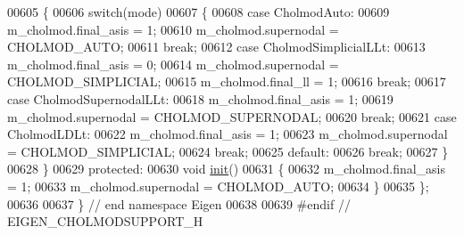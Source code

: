 \begin{DoxyCode}
00605     \{
00606       \textcolor{keywordflow}{switch}(mode)
00607       \{
00608         \textcolor{keywordflow}{case} CholmodAuto:
00609           m\_cholmod.final\_asis = 1;
00610           m\_cholmod.supernodal = CHOLMOD\_AUTO;
00611           \textcolor{keywordflow}{break};
00612         \textcolor{keywordflow}{case} CholmodSimplicialLLt:
00613           m\_cholmod.final\_asis = 0;
00614           m\_cholmod.supernodal = CHOLMOD\_SIMPLICIAL;
00615           m\_cholmod.final\_ll = 1;
00616           \textcolor{keywordflow}{break};
00617         \textcolor{keywordflow}{case} CholmodSupernodalLLt:
00618           m\_cholmod.final\_asis = 1;
00619           m\_cholmod.supernodal = CHOLMOD\_SUPERNODAL;
00620           \textcolor{keywordflow}{break};
00621         \textcolor{keywordflow}{case} CholmodLDLt:
00622           m\_cholmod.final\_asis = 1;
00623           m\_cholmod.supernodal = CHOLMOD\_SIMPLICIAL;
00624           \textcolor{keywordflow}{break};
00625         \textcolor{keywordflow}{default}:
00626           \textcolor{keywordflow}{break};
00627       \}
00628     \}
00629   \textcolor{keyword}{protected}:
00630     \textcolor{keywordtype}{void} \hyperlink{structinit}{init}()
00631     \{
00632       m\_cholmod.final\_asis = 1;
00633       m\_cholmod.supernodal = CHOLMOD\_AUTO;
00634     \}
00635 \};
00636 
00637 \} \textcolor{comment}{// end namespace Eigen}
00638 
00639 \textcolor{preprocessor}{#endif // EIGEN\_CHOLMODSUPPORT\_H}
\end{DoxyCode}
